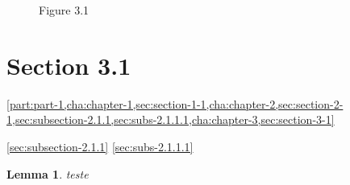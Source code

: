 \documentclass{book}
\newtheorem{lemma}{Lemma}
\begin{document}
\begin{figure}
  \centering

  \caption{Figure 3.1}
  \label{fig:figure-3-1}
\end{figure}

\section{Section 3.1}
\label{sec:section-3-1}

\cref{part:part-1,cha:chapter-1,sec:section-1-1,cha:chapter-2,sec:section-2-1,sec:subsection-2.1.1,sec:subs-2.1.1.1,cha:chapter-3,sec:section-3-1}

\cref{sec:subsection-2.1.1}
\cref{sec:subs-2.1.1.1}


\begin{lemma}
  teste
\end{lemma}

\makeatletter
\show\@currentcounter
\makeatother
\end{document}
